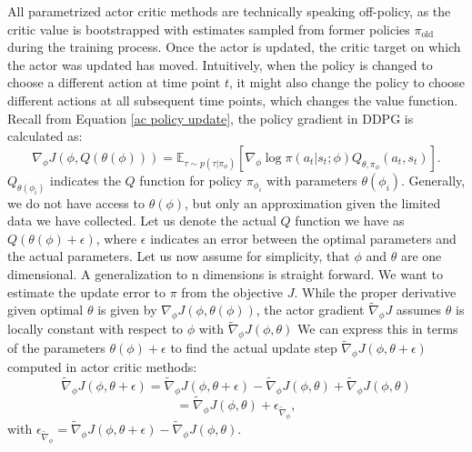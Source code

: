 All parametrized actor critic methods are technically speaking off-policy, as the critic value is bootstrapped with estimates sampled from former policies $\pi_{\mathrm{old}}$ during the training process. 
Once the actor is updated, the 
critic target on which the actor was updated has moved. Intuitively, when the policy is changed to choose a different action at time point $t$, it might also change 
the policy to choose different actions at 
all subsequent time points, which changes the value function. \\

Recall from Equation \ref{ac policy update}, the policy gradient in DDPG is calculated as:
\begin{equation}
    \nabla_{\phi} J(\phi, Q(\theta(\phi))) = \mathbb{E}_{\tau \sim p(\tau | \pi_{\phi})} \left[\nabla_{\phi} \log \pi(a_t|s_t;\phi) Q_{\theta, \pi_\phi}(a_t, s_t) \right].
\end{equation}
$Q_{\theta(\phi_i)}$ indicates the $Q$ function for policy $\pi_{\phi_{i}}$ with parameters 
$\theta(\phi_i)$. 
Generally, we do not have access to $\theta(\phi)$, but only an approximation given the limited data we have collected. Let us denote the actual 
$Q$ function we have as $Q(\theta(\phi) + \epsilon)$, where $\epsilon$ indicates an error between the optimal parameters and the actual parameters.
Let us now assume for simplicity, that $\phi$ and $\theta$ are one dimensional. A generalization to n dimensions is straight forward. We want 
to estimate the update error to $\pi$ from the objective $J$. While the proper derivative given optimal $\theta$ is given by $\nabla_{\phi} J(\phi, \theta(\phi))$,
the actor gradient $\widetilde{\nabla}_\phi J$ assumes $\theta$ is locally constant with respect to $\phi$ with $\widetilde{\nabla}_\phi J(\phi, \theta)$ 
We can express this in terms of the parameters $\theta(\phi) + \epsilon$ to 
find the actual update step $\widetilde{\nabla}_{\phi} J(\phi, \theta + \epsilon)$ computed in actor critic methods:
\begin{equation*}
    \widetilde{\nabla}_{\phi} J(\phi, \theta + \epsilon) = \widetilde{\nabla}_{\phi} J(\phi, \theta + \epsilon) - \widetilde{\nabla}_{\phi} J(\phi, \theta) + \widetilde{\nabla}_{\phi} J(\phi, \theta)
\end{equation*}
\begin{equation*}
    = \widetilde{\nabla}_{\phi} J(\phi, \theta) + \epsilon_{\widetilde{\nabla}_{\phi}},
\end{equation*}
with $\epsilon_{\widetilde{\nabla}_{\phi}} = \widetilde{\nabla}_{\phi} J(\phi, \theta + \epsilon) - \widetilde{\nabla}_{\phi} J(\phi, \theta)$.
